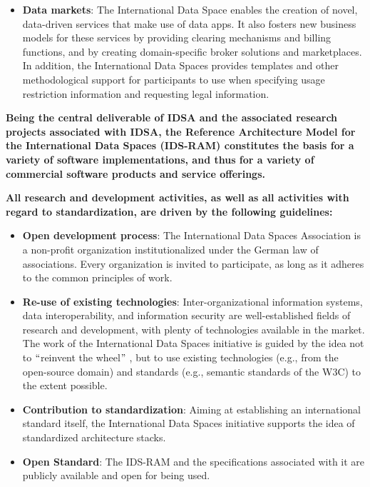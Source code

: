 \begin{itemize}
	\item \textbf{Data markets}: The International Data Space enables the creation of novel, data-driven services that make use of data apps. It also fosters new business models for these services by providing clearing mechanisms and billing functions, and by creating domain-specific broker solutions and marketplaces. In addition, the International Data Spaces provides templates and other methodological support for participants to use when specifying usage restriction information and requesting legal information. 

\end{itemize}

\textbf{Being the central deliverable of IDSA and the associated research projects associated with IDSA, the Reference Architecture Model for the International Data Spaces (IDS-RAM) constitutes the basis for a variety of software implementations, and thus for a variety of commercial software products and service offerings.}


\textbf{All research and development activities, as well as all activities with regard to standardization, are driven by the following guidelines:}

\begin{itemize}

	\item \textbf{Open development process}: The International Data Spaces Association is a non-profit organization institutionalized under the German law of associations. Every organization is invited to participate, as long as it adheres to the common principles of work.

	\item \textbf{Re-use of existing technologies}: Inter-organizational information systems, data interoperability, and information security are well-established fields of research and development, with plenty of technologies available in the market. The work of the International Data Spaces initiative is guided by the idea not to $``$reinvent the wheel$"$ , but to use existing technologies (e.g., from the open-source domain) and standards (e.g., semantic standards of the W3C) to the extent possible.

	\item \textbf{Contribution to standardization}: Aiming at establishing an international standard itself, the International Data Spaces initiative supports the idea of standardized architecture stacks.
	
	\item \textbf{Open Standard}: The IDS-RAM and the specifications associated with it are publicly available and open for being used.

\end{itemize}


